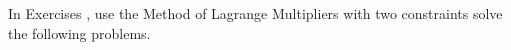 {\noindent In Exercises} 
{,  use the Method of Lagrange Multipliers with two constraints solve the following problems.
}
